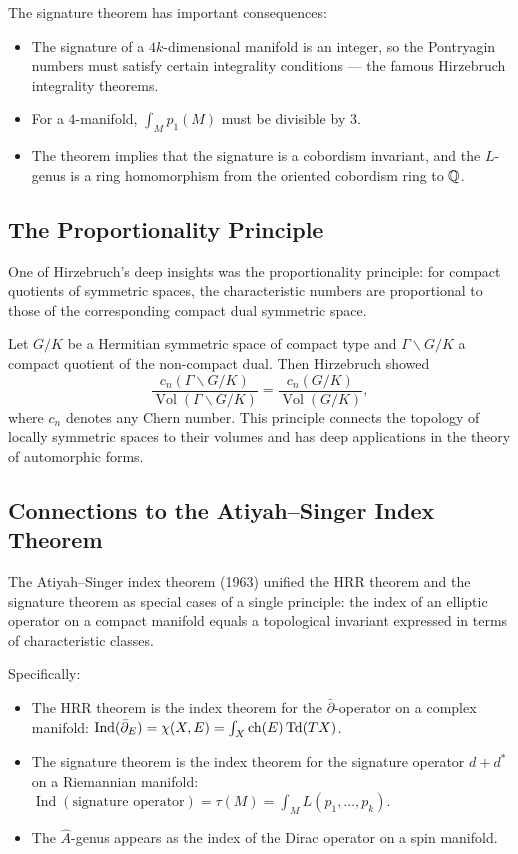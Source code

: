 The signature theorem has important consequences:
\begin{itemize}
    \item The signature of a \(4k\)-dimensional manifold is an integer,
    so the Pontryagin numbers must satisfy certain integrality
    conditions --- the famous Hirzebruch integrality theorems.
    \item For a \(4\)-manifold, \(\int_M p_1(M)\) must be divisible by
    \(3\).
    \item The theorem implies that the signature is a cobordism
    invariant, and the \(L\)-genus is a ring homomorphism from the
    oriented cobordism ring to \(\mathbb{Q}\).
\end{itemize}

\subsection{The Proportionality Principle}

One of Hirzebruch's deep insights was the proportionality principle:
for compact quotients of symmetric spaces, the characteristic numbers
are proportional to those of the corresponding compact dual symmetric
space.

Let \(G/K\) be a Hermitian symmetric space of compact type and
\(\Gamma \backslash G/K\) a compact quotient of the non-compact dual.
Then Hirzebruch showed
\[
\frac{c_n(\Gamma \backslash G/K)}{\operatorname{Vol}(\Gamma \backslash G/K)}
= \frac{c_n(G/K)}{\operatorname{Vol}(G/K)},
\]
where \(c_n\) denotes any Chern number. This principle connects the
topology of locally symmetric spaces to their volumes and has deep
applications in the theory of automorphic forms.

\subsection{Connections to the Atiyah--Singer Index Theorem}

The Atiyah--Singer index theorem (1963) unified the HRR theorem and the
signature theorem as special cases of a single principle: the index of
an elliptic operator on a compact manifold equals a topological
invariant expressed in terms of characteristic classes.

Specifically:
\begin{itemize}
    \item The HRR theorem is the index theorem for the
    \(\bar\partial\)-operator on a complex manifold:
    \(\operatorname{Ind}(\bar\partial_E) = \chi(X, E)
    = \int_X \operatorname{ch}(E) \operatorname{Td}(TX)\).
    \item The signature theorem is the index theorem for the signature
    operator \(d + d^*\) on a Riemannian manifold:
    \(\operatorname{Ind}(\text{signature operator}) = \tau(M)
    = \int_M L(p_1, \dots, p_k)\).
    \item The \(\hat{A}\)-genus appears as the index of the Dirac
    operator on a spin manifold.
\end{itemize}

